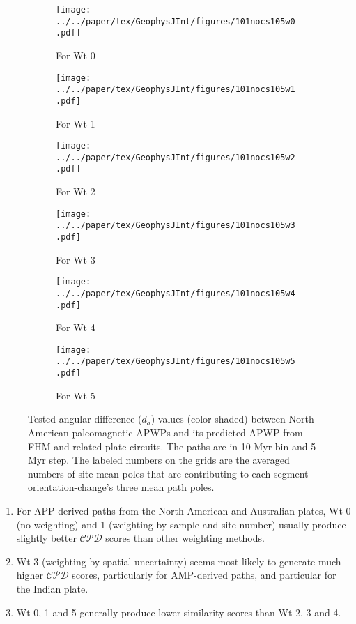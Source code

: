\begin{figure}[!ht]
	\centering
	\begin{subfigure}{.495\textwidth}
		\texttt{[image: ../../paper/tex/GeophysJInt/figures/101nocs105w0.pdf]}
		\caption{For Wt 0}\label{fig-na-daw0}
	\end{subfigure}
	\vspace{.1em}
	\begin{subfigure}{.495\textwidth}
		\texttt{[image: ../../paper/tex/GeophysJInt/figures/101nocs105w1.pdf]}
		\caption{For Wt 1}\label{fig-na-daw1}
	\end{subfigure}
	\vspace{.1em}
	\begin{subfigure}{.495\textwidth}
		\texttt{[image: ../../paper/tex/GeophysJInt/figures/101nocs105w2.pdf]}
		\caption{For Wt 2}\label{fig-na-daw2}
	\end{subfigure}
	\vspace{.1em}
	\begin{subfigure}{.495\textwidth}
		\texttt{[image: ../../paper/tex/GeophysJInt/figures/101nocs105w3.pdf]}
		\caption{For Wt 3}\label{fig-na-daw3}
	\end{subfigure}
	\vspace{.1em}
	\begin{subfigure}{.495\textwidth}
		\texttt{[image: ../../paper/tex/GeophysJInt/figures/101nocs105w4.pdf]}
		\caption{For Wt 4}\label{fig-na-daw4}
	\end{subfigure}
	\vspace{.1em}
	\begin{subfigure}{.495\textwidth}
		\texttt{[image: ../../paper/tex/GeophysJInt/figures/101nocs105w5.pdf]}
		\caption{For Wt 5}\label{fig-na-daw5}
	\end{subfigure}
	\caption[$d_a$ of each pair of segment-oreintation-changes for North American
10/5 Myr APWPs]{Tested angular difference ($d_a$) values (color shaded) between
North American paleomagnetic APWPs and its predicted APWP from FHM and related
plate circuits. The paths are in 10 Myr bin and 5 Myr step. The labeled numbers
on the grids are the averaged numbers of site mean poles that are contributing
to each segment-orientation-change's three mean path poles.}\label{fig-nada}
\end{figure}
%
\begin{enumerate}
  \item For APP-derived paths from the North American and Australian plates,
		Wt 0 (no weighting) and 1 (weighting by sample and site
		number) usually produce slightly better $\mathcal{CPD}$ scores than
		other weighting methods.
  \item Wt 3 (weighting by spatial uncertainty) seems most likely
		to generate much higher $\mathcal{CPD}$ scores, particularly for
		AMP-derived paths, and particular for the Indian plate.
  \item Wt 0, 1 and 5 generally produce lower similarity scores than Wt 2, 3 and
		4.
\end{enumerate}

